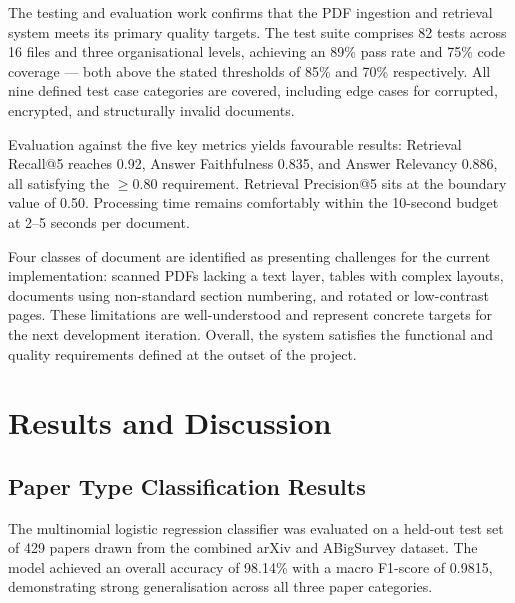 \documentclass[12pt,a4paper]{report}
\begin{document}
The testing and evaluation work confirms that the PDF ingestion and retrieval
system meets its primary quality targets. The test suite comprises 82 tests
across 16 files and three organisational levels, achieving an 89\% pass rate and
75\% code coverage --- both above the stated thresholds of 85\% and 70\%
respectively. All nine defined test case categories are covered, including edge
cases for corrupted, encrypted, and structurally invalid documents.

Evaluation against the five key metrics yields favourable results: Retrieval
Recall@5 reaches 0.92, Answer Faithfulness 0.835, and Answer Relevancy 0.886,
all satisfying the $\geq 0.80$ requirement. Retrieval Precision@5 sits at the
boundary value of 0.50. Processing time remains comfortably within the 10-second
budget at 2--5 seconds per document.

Four classes of document are identified as presenting challenges for the current
implementation: scanned PDFs lacking a text layer, tables with complex layouts,
documents using non-standard section numbering, and rotated or low-contrast
pages. These limitations are well-understood and represent concrete targets for
the next development iteration. Overall, the system satisfies the functional and
quality requirements defined at the outset of the project.

\chapter{Results and Discussion}

\section{Paper Type Classification Results}

The multinomial logistic regression classifier was evaluated on a held-out test
set of 429 papers drawn from the combined arXiv and ABigSurvey dataset. The
model achieved an overall accuracy of 98.14\% with a macro F1-score of 0.9815,
demonstrating strong generalisation across all three paper categories.
\end{document}
